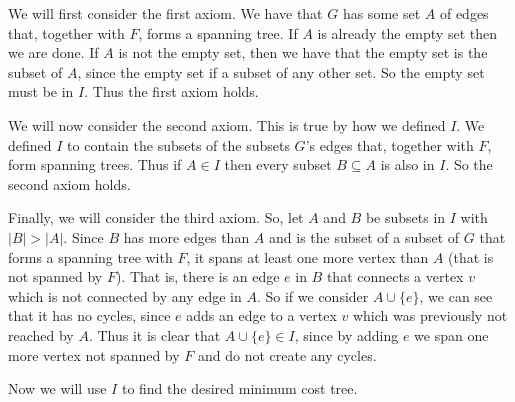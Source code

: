 \documentclass{article}
\begin{document}
\begin{description}
        We will first consider the first axiom. We have that $G$ has some set
        $A$ of edges that, together with $F$, forms a spanning tree. If $A$ is
        already the empty set then we are done. If $A$ is not the empty set, then
        we have that the empty set is the subset of $A$, since the empty set if
        a subset of any other set. So the empty set must be in $I$. Thus the
        first axiom holds.

        We will now consider the second axiom. This is true by how we defined
        $I$. We defined $I$ to contain the subsets of the subsets $G$'s edges that, together
        with $F$, form spanning trees. Thus if $A \in I$ then every subset $B
        \subseteq A$ is also in $I$. So the second axiom holds.

        Finally, we will consider the third axiom. So, let $A$ and $B$ be
        subsets in $I$ with $|B| > |A|$. Since $B$ has more edges than $A$ and
        is the subset of a subset of $G$ that forms a spanning tree with $F$, it
        spans at least one more vertex than $A$ (that is not spanned by $F$).
        That is, there is an edge $e$ in
        $B$ that connects a vertex $v$ which is not connected by any edge in
        $A$. So if we consider $A \cup \{e\}$, we can see that it has no cycles,
        since $e$ adds an edge to a vertex $v$ which was previously not reached
        by $A$. Thus it is clear that $A \cup \{e\} \in I$, since by adding $e$
        we span one more vertex not spanned by $F$ and do not create any cycles.

        \vspace{8mm}
        Now we will use $I$ to find the desired minimum cost tree.


\end{description}
\end{document}
